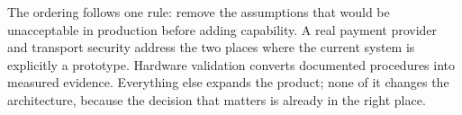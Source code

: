 The ordering follows one rule: remove the assumptions that would be unacceptable in
production before adding capability. A real payment provider and transport security
address the two places where the current system is explicitly a prototype. Hardware
validation converts documented procedures into measured evidence. Everything else
expands the product; none of it changes the architecture, because the decision that
matters is already in the right place.
